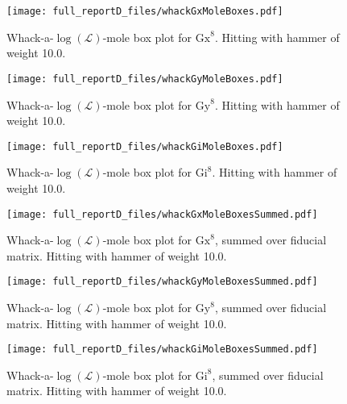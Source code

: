 {\begin{figure}
\begin{center}
\texttt{[image: full\_reportD\_files/whackGxMoleBoxes.pdf]}
\caption{Whack-a-$\log(\mathcal{L})$-mole box plot for $\mathrm{Gx}^{8}$.  Hitting with hammer of weight 10.0.\label{WhackGxMoleBoxPlot}}
\end{center}
\end{figure}

\begin{figure}
\begin{center}
\texttt{[image: full\_reportD\_files/whackGyMoleBoxes.pdf]}
\caption{Whack-a-$\log(\mathcal{L})$-mole box plot for $\mathrm{Gy}^{8}$.  Hitting with hammer of weight 10.0.\label{WhackGyMoleBoxPlot}}
\end{center}
\end{figure}

\begin{figure}
\begin{center}
\texttt{[image: full\_reportD\_files/whackGiMoleBoxes.pdf]}
\caption{Whack-a-$\log(\mathcal{L})$-mole box plot for $\mathrm{Gi}^{8}$.  Hitting with hammer of weight 10.0.\label{WhackGiMoleBoxPlot}}
\end{center}
\end{figure}

\begin{figure}
\begin{center}
\texttt{[image: full\_reportD\_files/whackGxMoleBoxesSummed.pdf]}
\caption{Whack-a-$\log(\mathcal{L})$-mole box plot for $\mathrm{Gx}^{8}$, summed over fiducial matrix.  Hitting with hammer of weight 10.0.\label{WhackGxMoleBoxPlotSummed}}
\end{center}
\end{figure}

\begin{figure}
\begin{center}
\texttt{[image: full\_reportD\_files/whackGyMoleBoxesSummed.pdf]}
\caption{Whack-a-$\log(\mathcal{L})$-mole box plot for $\mathrm{Gy}^{8}$, summed over fiducial matrix.  Hitting with hammer of weight 10.0.\label{WhackGyMoleBoxPlotSummed}}
\end{center}
\end{figure}

\begin{figure}
\begin{center}
\texttt{[image: full\_reportD\_files/whackGiMoleBoxesSummed.pdf]}
\caption{Whack-a-$\log(\mathcal{L})$-mole box plot for $\mathrm{Gi}^{8}$, summed over fiducial matrix.  Hitting with hammer of weight 10.0.\label{WhackGiMoleBoxPlotSummed}}
\end{center}
\end{figure}

}{}
